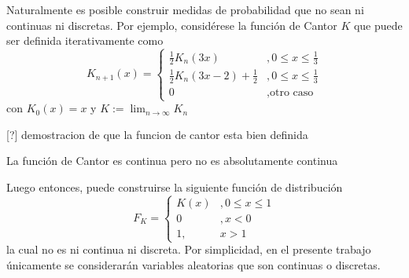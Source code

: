 Naturalmente es posible construir medidas de probabilidad que no sean ni continuas ni discretas. Por ejemplo, considérese la función de Cantor $K$ que puede ser definida iterativamente como
\begin{equation}
K_{n+1}(x) =
\begin{cases}
\frac{1}{2} K_n(3 x) &, 0\leq x \leq \frac{1}{3} \\
\frac{1}{2} K_n(3 x-2) + \frac{1}{2} &, 0\leq x \leq \frac{1}{3} \\
0 &, \text{otro caso}
\end{cases}
\end{equation}
con $K_0(x) = x$ y $K := \lim_{n\rightarrow \infty} K_n$

[?] demostracion de que la funcion de cantor esta bien definida

\begin{proposicion}
La función de Cantor es continua pero no es absolutamente continua
\end{proposicion}

Luego entonces, puede construirse la siguiente función de distribución
\begin{equation}
F_K = \begin{cases}
K(x) &, 0\leq x \leq 1 \\
0 &, x < 0 \\
1 ,& x > 1
\end{cases}
\end{equation}
la cual no es ni continua ni discreta. Por simplicidad, en el presente trabajo únicamente se considerarán variables aleatorias que son continuas o discretas.




